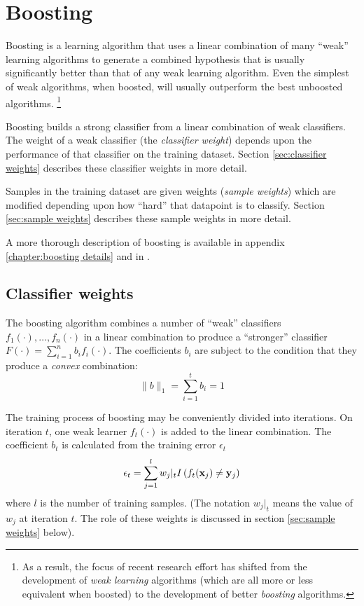 \section{Boosting}

Boosting is a learning algorithm that uses a linear combination of
many ``weak'' learning algorithms to generate a combined hypothesis
that is usually significantly better than that of any weak learning algorithm.
Even the simplest of weak algorithms, when boosted, will usually
outperform the best unboosted algorithms.
\footnote{As a result, the focus of recent research effort has shifted from the
development of \emph{weak learning} algorithms (which are all more
or less equivalent when boosted) to the development of better \emph{boosting}
algorithms.}

Boosting builds a strong classifier from a linear combination of
weak classifiers.  The weight of a weak classifier (the
\emph{classifier weight}) depends upon the performance of that
classifier on the training dataset.  Section \ref{sec:classifier
weights} describes these classifier weights in more detail.

Samples in the training dataset are given weights (\emph{sample
weights}) which are modified depending upon how ``hard'' that
datapoint is to classify.  Section \ref{sec:sample weights} describes
these sample weights in more detail.

A more thorough description of boosting is available in appendix
\ref{chapter:boosting details} and in \cite{Freund96}.


\subsection{Classifier weights}
\label{sec:classifier weights}

The boosting algorithm combines a number of ``weak'' classifiers
$f_1(\cdot), \ldots, f_n(\cdot)$ in a linear combination to produce a
``stronger'' classifier $F(\cdot) = \sum_{i=1}^{n} b_i f_i(\cdot)$.
The coefficients $b_i$ are subject to the condition that they produce a
\emph{convex} combination:
%
\begin{equation}
\label{eqn:p=1}
\|b\|_1 = \sum_{i=1}^{t} b_i = 1
\end{equation}
%

The training process of boosting may be conveniently divided into
iterations.  On iteration $t$, one
weak learner $f_t(\cdot)$ is added to the linear combination.
The coefficient $b_t$ is calculated from the training error $\epsilon_t$ 
%
\begin{equation}
\epsilon_t = \sum_{j=1}^l w_j |_t 
I \left( f_t(\mathbf{x}_j) \neq \mathbf{y}_j\right)
\label{eqn:training error}
\end{equation}
%
where $l$ is the number of training samples.  (The notation $w_j|_t$
means the value of $w_j$ at iteration $t$.  The role of these weights
is discussed in section \ref{sec:sample weights} below).

